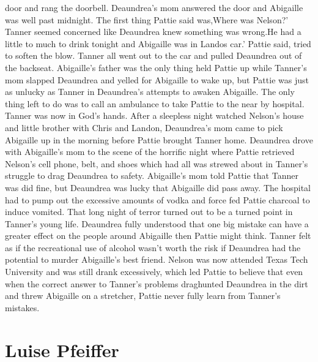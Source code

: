 \documentclass[12pt]{book}
\begin{document}
door and rang the doorbell. Deaundrea's mom answered the door and Abigaille was well past midnight. The first thing Pattie said was,Where was Nelson?' Tanner seemed concerned like Deaundrea knew something was wrong.He had a little to much to drink tonight and Abigaille was in Landos car.' Pattie said, tried to soften the blow. Tanner all went out to the car and pulled Deaundrea out of the backseat. Abigaille's father was the only thing held Pattie up while Tanner's mom slapped Deaundrea and yelled for Abigaille to wake up, but Pattie was just as unlucky as Tanner in Deaundrea's attempts to awaken Abigaille. The only thing left to do was to call an ambulance to take Pattie to the near by hospital. Tanner was now in God's hands. After a sleepless night watched Nelson's house and little brother with Chris and Landon, Deaundrea's mom came to pick Abigaille up in the morning before Pattie brought Tanner home. Deaundrea drove with Abigaille's mom to the scene of the horrific night where Pattie retrieved Nelson's cell phone, belt, and shoes which had all was strewed about in Tanner's struggle to drag Deaundrea to safety. Abigaille's mom told Pattie that Tanner was did fine, but Deaundrea was lucky that Abigaille did pass away. The hospital had to pump out the excessive amounts of vodka and force fed Pattie charcoal to induce vomited. That long night of terror turned out to be a turned point in Tanner's young life. Deaundrea fully understood that one big mistake can have a greater effect on the people around Abigaille then Pattie might think. Tanner felt as if the recreational use of alcohol wasn't worth the risk if Deaundrea had the potential to murder Abigaille's best friend. Nelson was now attended Texas Tech University and was still drank excessively, which led Pattie to believe that even when the correct answer to Tanner's problems draghunted Deaundrea in the dirt and threw Abigaille on a stretcher, Pattie never fully learn from Tanner's mistakes.



\chapter{Luise Pfeiffer}
\end{document}
